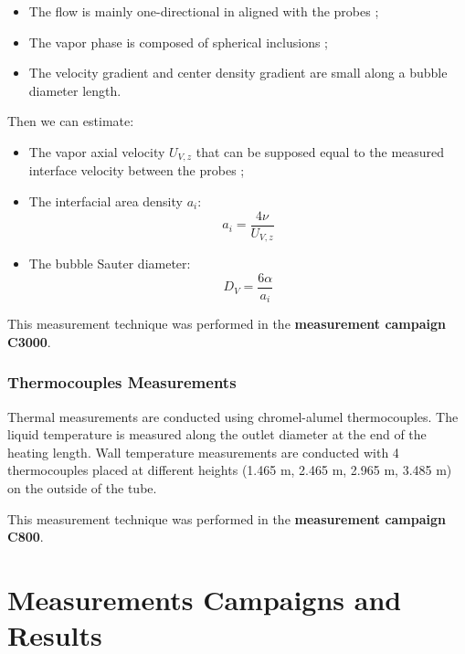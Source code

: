 \begin{itemize}
\item The flow is mainly one-directional in aligned with the probes ;
\item The vapor phase is composed of spherical inclusions ;
\item The velocity gradient and center density gradient are small along a bubble diameter length.
\end{itemize}

Then we can estimate: 

\begin{itemize}
\item The vapor axial velocity $U_{V,z}$ that can be supposed equal to the measured interface velocity between the probes ;
\item The interfacial area density $a_{i}$:
\begin{equation}
a_{i} = \frac{4 \nu }{U_{V,z}}
\end{equation}
\item The bubble Sauter diameter:
\begin{equation}
D_{V} = \frac{6 \alpha }{a_{i}}
\end{equation}
\end{itemize}


\begin{remark*}{}
This measurement technique was performed in the \textbf{measurement campaign C3000}.
\end{remark*}


\subsubsection{Thermocouples Measurements}

Thermal measurements are conducted using chromel-alumel thermocouples. The liquid temperature is measured along the outlet diameter at the end of the heating length. Wall temperature measurements are conducted with 4 thermocouples placed at different heights (1.465 m, 2.465 m, 2.965 m, 3.485 m) on the outside of the tube.

\begin{remark*}{}
This measurement technique was performed in the \textbf{measurement campaign C800}.
\end{remark*}



\section{Measurements Campaigns and Results}

